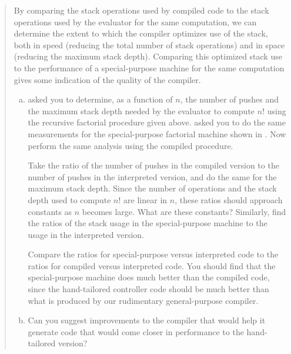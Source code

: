 \begin{quote}
 By comparing the stack operations
used by compiled code to the stack operations used by the evaluator for the
same computation, we can determine the extent to which the compiler optimizes
use of the stack, both in speed (reducing the total number of stack operations)
and in space (reducing the maximum stack depth).  Comparing this optimized
stack use to the performance of a special-purpose machine for the same
computation gives some indication of the quality of the compiler.

\begin{enumerate}[a.]

\item
{} asked you to determine, as a function of \( n \), the number
of pushes and the maximum stack depth needed by the evaluator to compute \( n! \)
using the recursive factorial procedure given above.   asked
you to do the same measurements for the special-purpose factorial machine shown
in . Now perform the same analysis using the compiled
 procedure.

Take the ratio of the number of pushes in the compiled version to the number of
pushes in the interpreted version, and do the same for the maximum stack depth.
Since the number of operations and the stack depth used to compute \( n! \)  are
linear in \( n \), these ratios should approach constants as \( n \) becomes large.
What are these constants?  Similarly, find the ratios of the stack usage in the
special-purpose machine to the usage in the interpreted version.

Compare the ratios for special-purpose versus interpreted code to the ratios
for compiled versus interpreted code.  You should find that the special-purpose
machine does much better than the compiled code, since the hand-tailored
controller code should be much better than what is produced by our rudimentary
general-purpose compiler.

\item
Can you suggest improvements to the compiler that would help it generate code
that would come closer in performance to the hand-tailored version?

\end{enumerate}
\end{quote}

